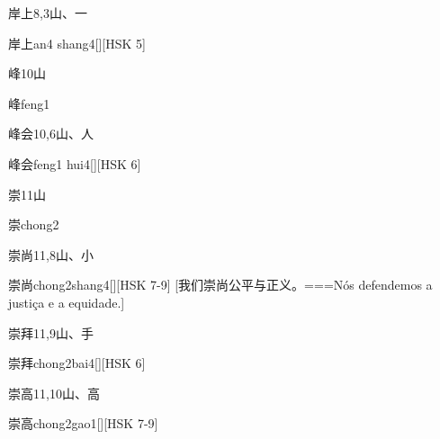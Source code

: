 \begin{Entry}{岸上}{8,3}{⼭、⼀}
  \begin{Phonetics}{岸上}{an4 shang4}[][HSK 5]
  \end{Phonetics}
\end{Entry}

\begin{Entry}{峰}{10}{⼭}
  \begin{Phonetics}{峰}{feng1}
  \end{Phonetics}
\end{Entry}

\begin{Entry}{峰会}{10,6}{⼭、⼈}
  \begin{Phonetics}{峰会}{feng1 hui4}[][HSK 6]
  \end{Phonetics}
\end{Entry}

\begin{Entry}{崇}{11}{⼭}
  \begin{Phonetics}{崇}{chong2}
  \end{Phonetics}
\end{Entry}

\begin{Entry}{崇尚}{11,8}{⼭、⼩}
  \begin{Phonetics}{崇尚}{chong2shang4}[][HSK 7-9]
    [我们崇尚公平与正义。===Nós defendemos a justiça e a equidade.]
  \end{Phonetics}
\end{Entry}

\begin{Entry}{崇拜}{11,9}{⼭、⼿}
  \begin{Phonetics}{崇拜}{chong2bai4}[][HSK 6]
  \end{Phonetics}
\end{Entry}

\begin{Entry}{崇高}{11,10}{⼭、⾼}
  \begin{Phonetics}{崇高}{chong2gao1}[][HSK 7-9]
  \end{Phonetics}
\end{Entry}

